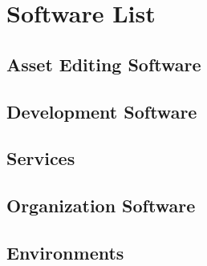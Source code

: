 \section{Software List}

\subsection{Asset Editing Software}

\subsection{Development Software}

\subsection{Services}

\subsection{Organization Software}

\subsection{Environments}
